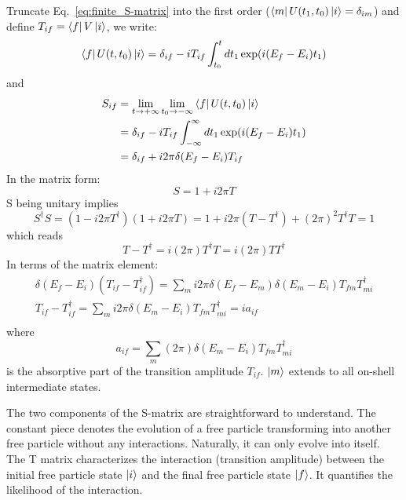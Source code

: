 Truncate Eq.~\ref{eq:finite_S-matrix} into the first order ($\bra{m} U(t_1, t_0) \ket{i} = \delta_{im}$)
and define $T_{if} = \bra{f} V \ket{i}$, we write:
\begin{equation}
    \bra{f} U(t, t_0) \ket{i} = \delta_{if} - iT_{if} \int_{t_0}^t dt_1 \exp(i(E_f - E_i)t_1)
\end{equation}
and 
\begin{equation}
    \begin{aligned}
	S_{if} &= \lim_{t\rightarrow +\infty}\lim_{t_0 \rightarrow -\infty} \bra{f} U(t, t_0) \ket{i}    \\
	    &= \delta_{if} - iT_{if} \int_{-\infty}^{\infty} dt_1 \exp(i(E_f - E_i)t_1)	\\
	    &= \delta_{if} + i2\pi\delta(E_f - E_i)T_{if}   \\
    \end{aligned}
\end{equation}
In the matrix form:
\begin{equation}
    S = 1 + i2\pi T
\end{equation}
S being unitary implies
\begin{equation}
    S^\dag S = (1 - i2\pi T^\dag) (1 + i2\pi T) = 1 + i2\pi(T - T^\dag) + (2\pi)^2 T^\dag T = 1
\end{equation}
which reads
\begin{equation}
    T - T^\dag = i (2\pi)T^\dag T = i(2\pi) T T^\dag
\end{equation}
In terms of the matrix element:
\begin{equation}
    \begin{gathered}
    \delta(E_f - E_i)(T_{if} - T^\dag_{if}) = \sum_m i2\pi\delta(E_f - E_m)\delta(E_m - E_i)T_{fm}T^\dag_{mi}	\\
    T_{if} - T^\dag_{if} = \sum_m i2\pi\delta(E_m - E_i)T_{fm}T^\dag_{mi} = ia_{if} \\
    \end{gathered}
\end{equation}
where 
\begin{equation}
    a_{if} = \sum_m (2\pi) \delta(E_m - E_i)T_{fm}T^\dag_{mi}
\end{equation}
is the absorptive part of the transition amplitude $T_{if}$. $\ket{m}$ extends
to all on-shell intermediate states.

The two components of the S-matrix are straightforward to understand.
The constant piece denotes the evolution of a free particle transforming into 
another free particle without any interactions. Naturally, it can only evolve into itself.
The T matrix characterizes the interaction (transition amplitude) between the initial free
particle state $\ket{i}$ and the final free particle state $\ket{f}$. It quantifies
the likelihood of the interaction.

